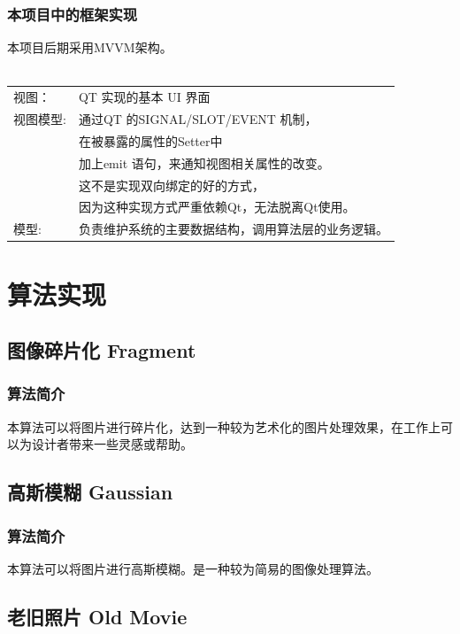 \documentclass[14pt,a4paper]{article}
\begin{document}
\subsubsection{本项目中的框架实现}
\nopagebreak
本项目后期采用MVVM架构。\\\\
\begin{center}
\begin{tabular}{ll}
视图： 	     & QT 实现的基本 UI 界面 \\ 
视图模型:   & 通过QT 的SIGNAL/SLOT/EVENT 机制，\\
				& 在被暴露的属性的Setter中\\
			    & 加上emit 语句，来通知视图相关属性的改变。\\
			    & 这不是实现双向绑定的好的方式，\\
			    & 因为这种实现方式严重依赖Qt，无法脱离Qt使用。\\
模型:		&负责维护系统的主要数据结构，调用算法层的业务逻辑。
\end{tabular}
\end{center}

\newpage
\section{算法实现}
\subsection{图像碎片化 Fragment}
\subsubsection{算法简介}

本算法可以将图片进行碎片化，达到一种较为艺术化的图片处理效果，在工作上可以为设计者带来一些灵感或帮助。
\subsection{高斯模糊 Gaussian}
\subsubsection{算法简介}
本算法可以将图片进行高斯模糊。是一种较为简易的图像处理算法。

\subsection{老旧照片 Old Movie}
\end{document}
